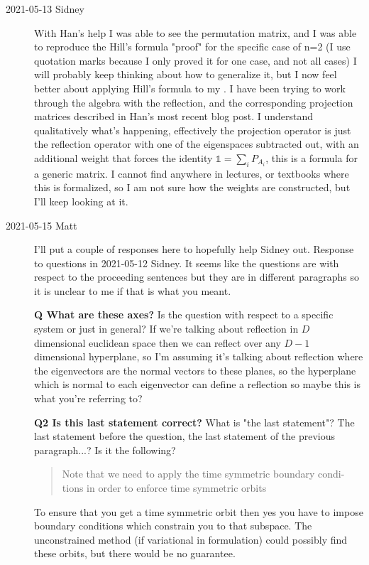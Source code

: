 \begin{description}
\item[2021-05-13 Sidney]
With Han's help I was able to see the permutation matrix, and I was able
to reproduce the Hill's formula "proof" for the specific case of n=2 (I
use quotation marks because I only proved it for one case, and not all
cases) I will probably keep thinking about how to generalize it, but I
now feel better about applying Hill's formula to my {\jacobianOrb}. I
have been trying to work through the algebra with the reflection, and the
corresponding projection matrices described in Han's most recent blog
post. I understand qualitatively what's happening, effectively the
projection operator is just the reflection operator with one of the
eigenspaces subtracted out, with an additional weight that forces the
identity $\mathbb{1}=\sum_iP_{A_i}$, this is a formula for a generic
matrix. I cannot find anywhere in lectures, or textbooks where this is
formalized, so I am not sure how the weights are constructed, but I'll
keep looking at it.

\item[2021-05-15 Matt]
I'll put a couple of responses here to hopefully help Sidney out.
Response to questions in 2021-05-12 Sidney.
It seems like the questions are with respect to the proceeding sentences but they are in different paragraphs so it is unclear to me if that is what you meant.

\textbf{Q What are these axes?} Is the question with respect to a specific system or just in general? If we're talking about reflection in $D$ dimensional euclidean space then we can reflect over any $D-1$ dimensional hyperplane, so I'm assuming it's talking about reflection where the eigenvectors are the normal vectors to these planes, so the hyperplane which is normal to each eigenvector can define a reflection so maybe this is what you're referring to?

\textbf{Q2 Is this last statement correct?} What is "the last statement"? The last statement before the question, the last statement of the previous paragraph...? Is it the following?
\begin{quote}
Note that we need to apply the time symmetric boundary condi-
tions in order to enforce time symmetric orbits
\end{quote}
To ensure that you get a time symmetric orbit then yes you have to impose boundary conditions which constrain you to that subspace. The unconstrained method (if variational in formulation) could possibly find these orbits, but there would be no guarantee.


\end{description}
